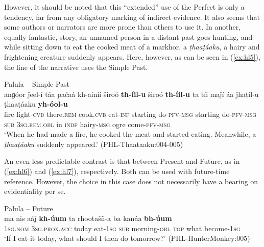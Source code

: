 \documentclass[output=paper]{langsci/langscibook}
\begin{document}
However, it should be noted that this “extended” use of the Perfect is only a tendency, far from any obligatory marking of indirect evidence. It also seems that some authors or narrators are more prone than others to use it. In another, equally fantastic, story, an unnamed person in a distant past goes hunting, and while sitting down to eat the cooked meat of a markhor, a \textit{ṭhaaṭáaku}, a hairy and frightening creature suddenly appears. Here, however, as can be seen in ‎(\ref{ex:hl5}), the line of the narrative uses the Simple Past.

\begin{exe}
	\ex Palula -- Simple Past \label{ex:hl5}\\
	\gll anɡóor ǰeel-í táa pačaá kh-ainií široó \textbf{th-íil-u} široó \textbf{th-íil-u} ta tíi maǰí áa ǰhaṭíl-u ṭhaaṭáaku \textbf{yh-óol-u}\\
	fire light-\textsc{cvb} there.\textsc{rem} cook.\textsc{cvb} eat-\textsc{inf} starting do-\textsc{pfv}-\textsc{msg} starting do-\textsc{pfv}-\textsc{msg} \textsc{sub} 3\textsc{sg}.\textsc{rem}.\textsc{obl} in \textsc{indf} hairy-\textsc{msg} ogre come-\textsc{pfv}-\textsc{msg}\\
	\trans ‘When he had made a fire, he cooked the meat and started eating. Meanwhile, a \textit{ṭhaaṭáaku} suddenly appeared.’ (PHL-Thaataaku:004-005)
\end{exe}

An even less predictable contrast is that between Present and Future, as in ‎(\ref{ex:hl6}) and ‎(\ref{ex:hl7}), respectively. Both can be used with future-time reference. However, the choice in this case does not necessarily have a bearing on evidentiality per se. 

\begin{exe}
	\ex Palula -- Future \label{ex:hl6}\\
	\gll ma nis aáǰ \textbf{kh-úum} ta rhootašíi-a ba kanáa \textbf{bh-úum}\\
	1\textsc{sg}.\textsc{nom} 3\textsc{sg}.\textsc{prox}.\textsc{acc} today eat-1\textsc{sg} \textsc{sub} morning-\textsc{obl} \textsc{top} what become-1\textsc{sg}\\
	\trans ‘If I eat it today, what should I then do tomorrow?’ (PHL-HunterMonkey:005)
\end{exe}
\end{document}
